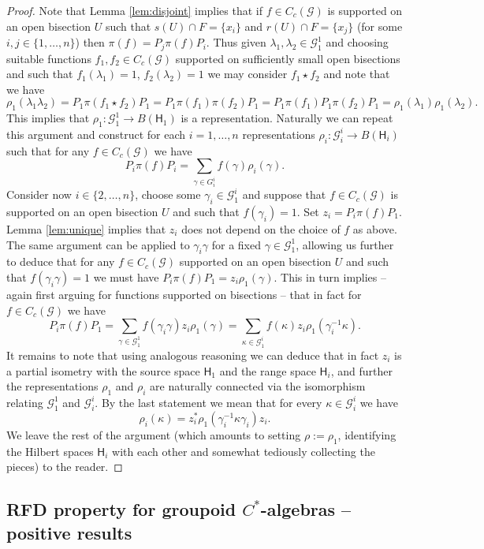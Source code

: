 \documentclass[11 pt, leqno, hidelinks]{amsart}%
\theoremstyle{plain}
\numberwithin{equation}{section}
\newcommand{\GG}{\mathcal{G}}
\newcommand{\Hil}{\mathsf{H}}
\begin{document}
\begin{proof}
Note that Lemma \ref{lem:disjoint} implies that if  $f\in C_c(\GG)$ is supported on an open bisection $U$ such that $s(U) \cap F = \{x_i\}$ and $r(U) \cap F = \{x_j\}$ (for some $i,j\in \{1, \ldots,n\}$) then $\pi(f) = P_j \pi(f) P_i$. Thus given $\lambda_1, \lambda_2 \in \GG^1_1$ and choosing suitable functions $f_1,f_2 \in C_c(\GG)$ supported on sufficiently small open bisections and such that $f_1(\lambda_1)=1$, $f_2 (\lambda_2)=1$ we may consider $f_1 \star f_2$ and note that we have
\[ \rho_1(\lambda_1 \lambda_2) = P_1 \pi(f_1 \star f_2) P_1 = P_1 \pi(f_1) \pi(f_2) P_1 =
P_1\pi(f_1) P_1\pi(f_2) P_1 = \rho_1(\lambda_1) \rho_1(\lambda_2).\]
This implies that $\rho_1:\GG_1^1 \to B(\Hil_1)$ is  a representation. Naturally we can repeat this argument and construct for each $i=1,\ldots,n$ representations $\rho_i:\GG_i^i \to B(\Hil_i)$ such that for any $f \in C_c(\GG)$ we have
\[ P_i\pi(f) P_i = \sum_{\gamma \in G_i^i} f(\gamma) \rho_i(\gamma).\]
Consider now $i\in\{2,\ldots,n\}$, choose some $\gamma_i \in \GG_{1}^{i}$  and suppose that $f\in C_c(\GG)$ is supported on an open bisection $U$ and such that $f(\gamma_i)=1$. Set $z_i= P_i \pi(f) P_1$. Lemma  \ref{lem:unique} implies that $z_i$ does not depend on the choice of $f$ as above. The same argument can be applied to $\gamma_i \gamma$ for a fixed $\gamma \in \GG_1^1$, allowing us further to deduce that for any $f\in C_c(\GG)$ supported on an open bisection $U$ and such that $f(\gamma_i\gamma)=1$ we must have $P_i \pi(f) P_1 = z_i \rho_1(\gamma)$. This in turn implies -- again first arguing for functions supported on bisections -- that in fact for $f \in C_c(\GG)$ we have
\[ P_i\pi(f)P_1 = \sum_{\gamma\in \GG_1^1} f(\gamma_i \gamma) z_i \rho_1(\gamma)= \sum_{\kappa\in \GG_1^i} f(\kappa) z_i \rho_1(\gamma_{i}^{-1} \kappa) .\]
It remains to note that using analogous reasoning we can deduce that in fact $z_i$ is a partial isometry with the source space $\Hil_1$ and the range space $\Hil_i$, and further the representations $\rho_1$ and $\rho_i$ are naturally connected via the isomorphism relating $\GG_1^1$ and $\GG_i^i$. By the last statement we mean that for every $\kappa \in \GG_i^i$ we have
\[\rho_i(\kappa) =z_i^* \rho_1(\gamma_i^{-1} \kappa \gamma_i) z_i.\]
We leave the rest of the argument (which amounts to setting $\rho:=\rho_1$, identifying the Hilbert spaces $\Hil_i$ with each other and somewhat tediously collecting the pieces) to the reader.
\end{proof}


\subsection{RFD property for groupoid $C^*$-algebras -- positive results}
\end{document}

